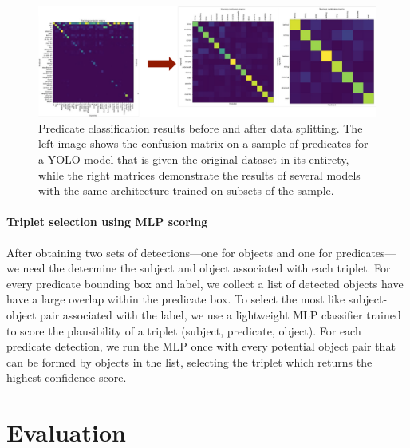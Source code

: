 \documentclass{article}
\begin{document}
\begin{figure}
    \includegraphics[width=\textwidth]{figures/figure3.png}
  \centering
  \caption{Predicate classification results before and after data splitting. The left image shows the confusion matrix on a sample of predicates for a YOLO model that is given the original dataset in its entirety, while the right matrices demonstrate the results of several models with the same architecture trained on subsets of the sample.}
\end{figure}


\paragraph{Triplet selection using MLP scoring}
After obtaining two sets of detections—one for objects and one for predicates—we need the determine the subject and object associated with each triplet. For every predicate bounding box and label, we collect a list of detected objects have have a large overlap within the predicate box. To select the most like subject-object pair associated with the label, we use a lightweight MLP classifier trained to score the plausibility of a triplet (subject, predicate, object). For each predicate detection, we run the MLP once with every potential object pair that can be formed by objects in the list, selecting the triplet which returns the highest confidence score. 
\section{Evaluation}
\end{document}
